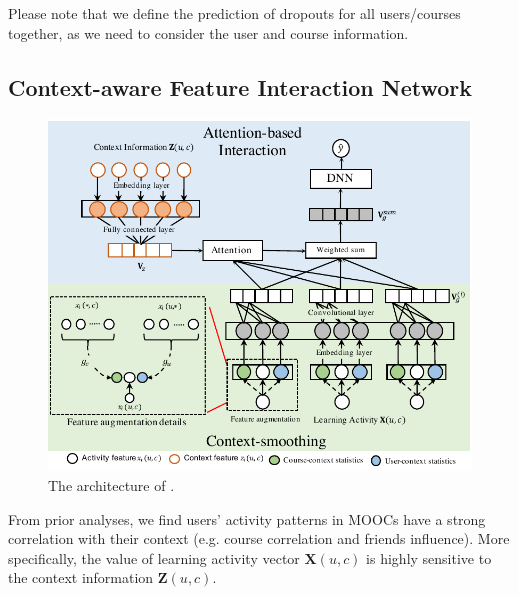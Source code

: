 Please note that we define the prediction of dropouts for all users/courses together, as we need to consider the user and course information. 


\subsection{Context-aware Feature Interaction Network}
 \begin{figure}
	\hspace{-0.1in}
	\centering
	\includegraphics[width=\linewidth]{model_arch_new.pdf}	
	\caption{The architecture of \modelname{}.}
	\label{fig:modelArch}
\end{figure}
 From prior analyses, we find users' activity patterns in MOOCs have a strong correlation with their context (e.g. course correlation and friends influence). More specifically, the value of learning activity vector $\textbf{X}(u,c)$ is highly sensitive to the context information $\textbf{Z}(u,c)$. 
